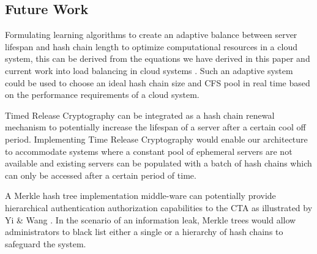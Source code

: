 \documentclass[a4paper,twoside]{article}
\begin{document}
\subsection{Future Work}

Formulating learning algorithms to create an adaptive balance between server lifespan and hash chain length to optimize computational resources in a cloud system, this can be derived from the equations we have derived in this paper and current work into load balancing in cloud systems \cite{randles_comparative_2010}. Such an adaptive system could be used to choose an ideal hash chain size and CFS pool in real time based on the performance requirements of a cloud system.

Timed Release Cryptography \cite{chalkias_timed_2006} can be integrated as a hash chain renewal mechanism to potentially increase the lifespan of a server after a certain cool off period. Implementing Time Release Cryptography would enable our architecture to accommodate systems where a constant pool of ephemeral servers are not available and existing servers can be populated with a batch of hash chains which can only be accessed after a certain period of time. 

A Merkle hash tree implementation middle-ware can potentially provide hierarchical authentication authorization capabilities to the CTA as illustrated by Yi \& Wang \cite{yi_cloud_2012}. In the scenario of an information leak, Merkle trees would allow administrators to black list either a single or a hierarchy of hash chains to safeguard the system.



\end{document}
